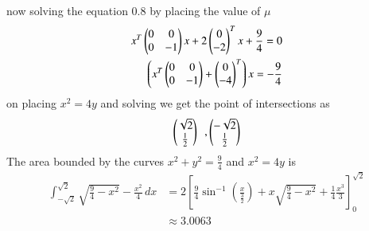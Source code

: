 \documentclass[journal]{IEEEtran}
\numberwithin{equation}{enumi}
\numberwithin{figure}{enumi}
\begin{document}
now solving the equation 0.8 by placing the value of $\mu$
\begin{align}
    x^T\begin{pmatrix}0 & 0 \\0 & -1\end{pmatrix}x+2\begin{pmatrix}0 \\-2\end{pmatrix}^Tx+\frac{9}{4}=0\\
    \left(x^T\begin{pmatrix}0&0 \\ 0&-1\end{pmatrix}+\begin{pmatrix}0\\-4\end{pmatrix}^T\right)x=-\frac{9}{4}\\
\end{align}
on placing $x^2=4y$ and solving we get the point of intersections as
\begin{align}
\begin{pmatrix}\sqrt{2}\\\frac{1}{2}\end{pmatrix}\,\,\, , \begin{pmatrix}-\sqrt{2}\\\frac{1}{2}\end{pmatrix}
\end{align}
The area bounded by the curves $x^2+y^2=\frac{9}{4}$ and $x^2=4y$ is 
\begin{align}
    \int_{-\sqrt{2}}^{\sqrt{2}} \sqrt{\frac{9}{4}-x^2}-\frac{x^2}{4} \, dx 
    &= 2\left[\frac{9}{4}\sin^{-1}\left(\frac{x}{\frac{3}{2}}\right)+x\sqrt{\frac{9}{4}-x^2}+\frac{1}{4}\frac{x^3}{3}\right]_0^{\sqrt{2}} \\
    &\approx 3.0063
\end{align}
\end{document}
